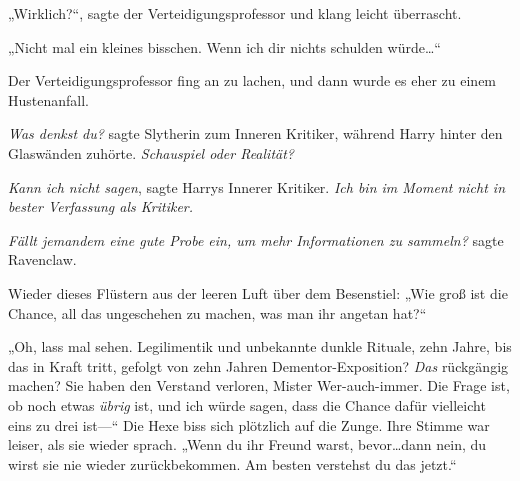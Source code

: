 „Wirklich?“, sagte der Verteidigungsprofessor und klang leicht überrascht.

„Nicht mal ein kleines bisschen. Wenn ich dir nichts schulden würde…“

Der Verteidigungsprofessor fing an zu lachen, und dann wurde es eher zu einem Hustenanfall.

\emph{Was denkst du?} sagte Slytherin zum Inneren Kritiker, während Harry hinter den Glaswänden zuhörte. \emph{Schauspiel oder Realität?}

\emph{Kann ich nicht sagen}, sagte Harrys Innerer Kritiker. \emph{Ich bin im Moment nicht in bester Verfassung als Kritiker.}

\emph{Fällt jemandem eine gute Probe ein, um mehr Informationen zu sammeln?} sagte Ravenclaw.

Wieder dieses Flüstern aus der leeren Luft über dem Besenstiel: „Wie groß ist die Chance, all das ungeschehen zu machen, was man ihr angetan hat?“

„Oh, lass mal sehen. Legilimentik und unbekannte dunkle Rituale, zehn Jahre, bis das in Kraft tritt, gefolgt von zehn Jahren Dementor-Exposition? \emph{Das} rückgängig machen? Sie haben den Verstand verloren, Mister Wer-auch-immer. Die Frage ist, ob noch etwas \emph{übrig} ist, und ich würde sagen, dass die Chance dafür vielleicht eins zu drei ist—“ Die Hexe biss sich plötzlich auf die Zunge. Ihre Stimme war leiser, als sie wieder sprach. „Wenn du ihr Freund warst, bevor…dann nein, du wirst sie nie wieder zurückbekommen. Am besten verstehst du das jetzt.“

